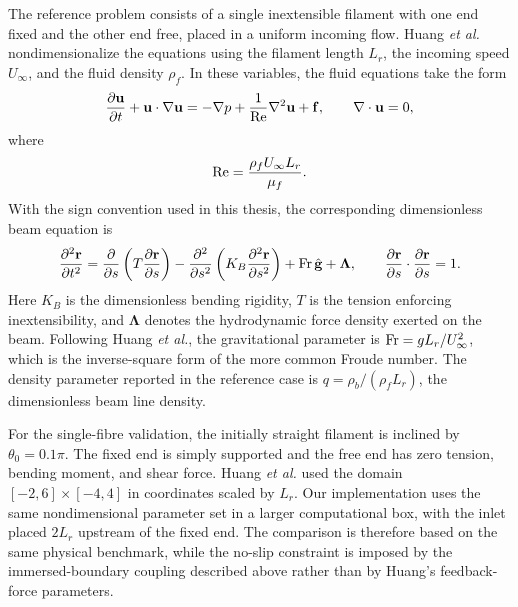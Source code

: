 The reference problem consists of a single inextensible filament with one end
fixed and the other end free, placed in a uniform incoming flow. Huang \emph{et
al.} nondimensionalize the equations using the filament length \(L_r\), the
incoming speed \(U_\infty\), and the fluid density \(\rho_f\). In these
variables, the fluid equations take the form
\begin{equation}
    \pdv{\mathbf{u}}{t}
    + \mathbf{u} \cdot \nabla \mathbf{u}
    =
    -\nabla p
    + \frac{1}{{\text {Re}}}\nabla^2 \mathbf{u}
    + \mathbf{f},
    \qquad
    \nabla \cdot \mathbf{u} = 0,
\end{equation}
where
\begin{equation}
    {\text {Re}} = \frac{\rho_f U_\infty L_r}{\mu_f}.
\end{equation}
With the sign convention used in this thesis, the corresponding dimensionless
beam equation is
\begin{equation}
    \pdv[2]{\mathbf{r}}{t}
    =
    \pdv{}{s}\left( T\pdv{\mathbf{r}}{s} \right)
    - \pdv[2]{}{s}\left( K_B\pdv[2]{\mathbf{r}}{s} \right)
    + {\rm Fr}\,\hat{\mathbf{g}}
    + \bm\Lambda,
    \qquad
    \pdv{\mathbf{r}}{s}\cdot\pdv{\mathbf{r}}{s} = 1 .
\end{equation}
Here \(K_B\) is the dimensionless bending rigidity, \(T\) is the tension
enforcing inextensibility, and \(\bm\Lambda\) denotes the hydrodynamic force
density exerted on the beam. Following Huang \emph{et al.}, the gravitational
parameter is \({\rm Fr}=gL_r/U_\infty^2\), which is the inverse-square form of
the more common Froude number. The density parameter reported in the reference
case is \(q=\rho_b/(\rho_f L_r)\), the dimensionless beam line density.

For the single-fibre validation, the initially straight filament is inclined by
\(\theta_0=0.1\pi\). The fixed end is simply supported and the free end has
zero tension, bending moment, and shear force. Huang \emph{et al.} used the
domain \([-2,6]\times[-4,4]\) in coordinates scaled by \(L_r\). Our
implementation uses the same nondimensional parameter set in a larger
computational box, with the inlet placed \(2L_r\) upstream of the fixed end.
The comparison is therefore based on the same physical benchmark, while the
no-slip constraint is imposed by the immersed-boundary coupling described above
rather than by Huang's feedback-force parameters.

